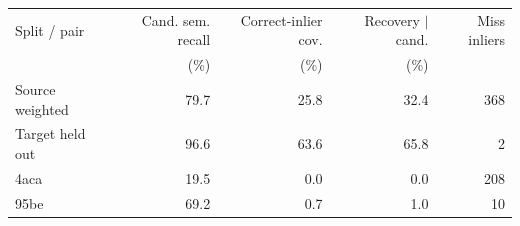 \begin{tabular}{lrrrr}
\toprule
Split / pair & Cand. sem. recall & Correct-inlier cov. & Recovery $|$ cand. & Miss inliers \\ 
 & (\%) & (\%) & (\%) & \\ 
\midrule
Source weighted & 79.7 & 25.8 & 32.4 & 368 \\
Target held out & 96.6 & 63.6 & 65.8 & 2 \\
4aca & 19.5 & 0.0 & 0.0 & 208 \\
95be & 69.2 & 0.7 & 1.0 & 10 \\
\bottomrule
\end{tabular}
